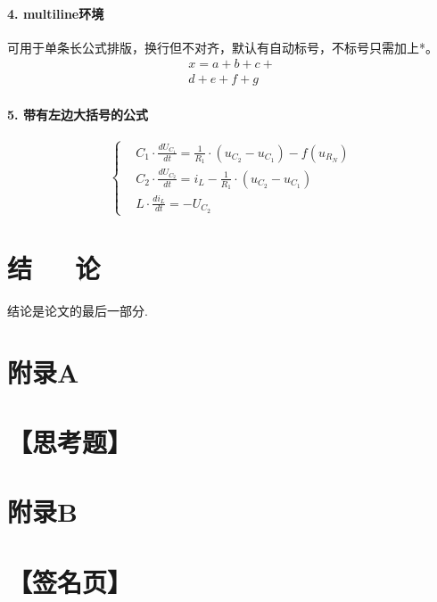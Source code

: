\documentclass[10pt,a4paper,twocolumn,twoside,UTF8]{ctexart}
\begin{document}
	\paragraph*{4. multiline环境}可用于单条长公式排版，换行但不对齐，默认有自动标号，不标号只需加上*。
		\begin{multline}
		x = a+b+c+{} \\
		d+e+f+g
		\end{multline}

	\paragraph*{5. 带有左边大括号的公式}
	\[\left\{%
		\begin{aligned}
		&C_{1} \cdot \frac{d U_{C_{1}}}{d t}=\frac{1}{R_{1}} \cdot(u_{C_{2}}-u_{C_{1}})-f(u_{R_{N}}) \\
		&C_{2} \cdot \frac{d U_{C_{2}}}{d t}=i_{L}-\frac{1}{R_{1}} \cdot(u_{C_{2}}-u_{C_{1}}) \\
		&L \cdot \frac{d i_{L}}{d t}=-U_{C_{2}}
		\end{aligned}
	   \right.
	\]

\section{结~~~论}
结论是论文的最后一部分.

\newpage
\renewcommand\refname{参考文献}



\clearpage

\begin{@twocolumnfalse}
	
\section*{\LARGE 附录A}
\section*{【思考题】}
\newpage

\section*{\LARGE 附录B}
\section*{【签名页】}

\end{@twocolumnfalse}
\end{document}
